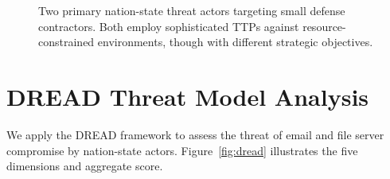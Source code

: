 \documentclass[sigconf,nonacm]{acmart}
\begin{document}
\begin{figure}[t]
\caption{Two primary nation-state threat actors targeting small defense contractors.
  Both employ sophisticated TTPs against resource-constrained environments, though with
  different strategic objectives.}
\label{fig:actors}
\end{figure}

\section{DREAD Threat Model Analysis}

We apply the DREAD framework to assess the threat of email and file server compromise
by nation-state actors. Figure~\ref{fig:dread} illustrates the five dimensions and
aggregate score.
\end{document}
